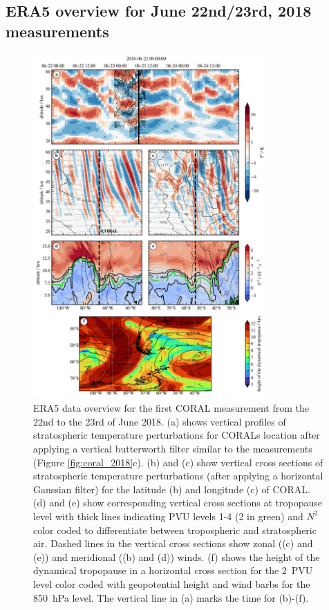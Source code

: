\subsection*{ERA5 overview for June 22nd/23rd, 2018 measurements}
\begin{figure}[tbp]
    \centering
    \includegraphics[width=0.8\textwidth]{figures_lidar/era5_trop_strat_33.png}
    \caption{ERA5 data overview for the first CORAL measurement from the 22nd to the 23rd of June 2018. (a) shows vertical profiles of stratospheric temperature perturbations for CORALs location after applying a vertical butterworth filter similar to the measurements (Figure \ref{fig:coral_2018}c). (b) and (c) show vertical cross sections of stratospheric temperature perturbations (after applying a horizontal Gaussian filter) for the latitude (b) and longitude (c) of CORAL. (d) and (e) show corresponding vertical cross sections at tropopause level with thick lines indicating PVU levels 1-4 (2 in green) and $N^2$ color coded to differentiate between tropospheric and stratospheric air. Dashed lines in the vertical cross sections show zonal ((c) and (e)) and meridional ((b) and (d)) winds. (f) shows the height of the dynamical tropopause in a horizontal cross section for the \SI{2}{PVU} level color coded with geopotential height and wind barbs for the \SI{850}{hPa} level. The vertical line in (a) marks the time for (b)-(f).}
    \label{fig:era5_2018}
\end{figure}
